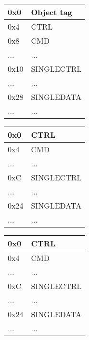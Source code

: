 \begin{figure}[H]

  \centering
  \begin{subfigure}{0.31\textwidth}
    \begin{tabular}{|l|l|}
      \hline
      0x0&Object tag \\ \hline
      0x4&CTRL       \\ \hline
      0x8&CMD        \\ \hline
      ...&...        \\ \hline
      0x10&SINGLECTRL\\ \hline
      ...&...        \\ \hline
      0x28&SINGLEDATA\\ \hline
      ...&...        \\ \hline
    \end{tabular}
    \caption{{\Java}}
    \label{fig:back:memlayout:java}
  \end{subfigure}
  \hfill
  \begin{subfigure}{0.31\textwidth}
    \begin{tabular}{|l|l|}
      \hline
      0x0&CTRL       \\ \hline
      0x4&CMD        \\ \hline
      ...&...        \\ \hline
      0xC&SINGLECTRL \\ \hline
      ...&...        \\ \hline
      0x24&SINGLEDATA\\ \hline
      ...&...        \\ \hline
    \end{tabular}
        \caption{{\C}}
    \label{fig:back:memlayout:c}
  \end{subfigure}
  \caption{Memory layout of objects}
  \label{fig:back:memlayout}
  \hfill
  \begin{subfigure}{0.31\textwidth}
    \begin{tabular}{|l|l|}
      \hline
      0x0&CTRL       \\ \hline
      0x4&CMD        \\ \hline
      ...&...        \\ \hline
      0xC&SINGLECTRL \\ \hline
      ...&...        \\ \hline
      0x24&SINGLEDATA\\ \hline
      ...&...        \\ \hline
    \end{tabular}
    \caption{\rust}
    \label{fig:back:memlayout:rust}
  \end{subfigure}

\end{figure}

